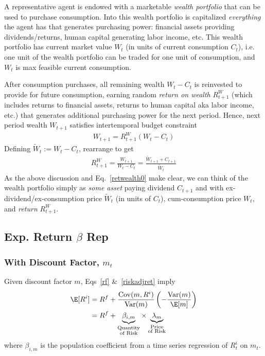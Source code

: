 \documentclass[12pt]{article}
\theoremstyle{plain}
\theoremstyle{definition}
\theoremstyle{remark}
\newcommand{\Cov}{\operatorname{Cov}}
\newcommand{\Var}{\operatorname{Var}}
\begin{document}
\begin{multicols*}{2}
A representative agent is endowed with a marketable \emph{wealth portfolio}
that can be used to purchase consumption.
Into this wealth portfolio is capitalized \emph{everything} the agent
has that generates purchasing power: financial assets providing
dividends/returns, human capital generating labor income, etc.  This
wealth portfolio has current market value $W_t$ (in units of current
consumption $C_t$), i.e. one unit of the wealth portfolio can be traded
for one unit of consumption, and $W_t$ is max feasible
current consumption.

After consumption purchases, all remaining wealth $W_t-C_t$ is
reinvested to provide for future consumption, earning random
\emph{return on wealth} $R^W_{t+1}$ (which includes returns to financial
assets, returns to human capital aka labor income, etc.) that
generates additional purchasing power for the next period.
Hence, next period wealth $W_{t+1}$ satisfies intertemporal
budget constraint
\begin{align*}
  W_{t+1} = R_{t+1}^W(W_t-C_t)
\end{align*}
Defining $\tilde{W}_t:=W_t-C_t$, rearrange to get
\begin{align}
  R_{t+1}^W
  = \frac{W_{t+1}}{W_t-C_t}
  = \frac{\tilde{W}_{t+1}+C_{t+1}}{\tilde{W}_t}
  \label{retwealth0}
\end{align}
As the above discussion and Eq.~\ref{retwealth0} make clear, we can think
of the wealth portfolio simply as \emph{some asset} paying dividend
$C_{t+1}$ and with ex-dividend/ex-consumption price $\tilde{W}_{t}$ (in
units of $C_t$), cum-consumption price $W_t$, and \emph{return}
$R_{t+1}^W$.

\clearpage
\subsection{Exp. Return $\beta$ Rep}

\subsubsection{With Discount Factor, $m_t$}

Given discount factor $m$, Eqs~\ref{rf} \&~\ref{riskadjret} imply
\begin{align}
  \E[R^i]
  &=
  R^f +
  \frac{\Cov(m,R^i)}{\Var(m)}
  \left(
  -\frac{\Var(m)}{\E[m]}
  \right)
  \notag
  \\
  &=
  R^f +
  \underbrace{\beta_{i,m}}_{\substack{\text{Quantity}\\\text{of Risk}}}
  \times
  \underbrace{\lambda_m}_{\substack{\text{Price}\\\text{of Risk}}}
  \label{eq:betarep}
\end{align}
where $\beta_{i,m}$ is the population coefficient from a time series
regression of $R^i_t$ on $m_t$.


\end{multicols*}
\end{document}
